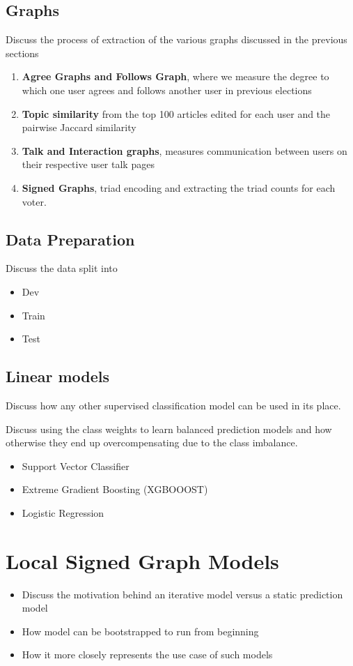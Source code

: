 \subsection{Graphs}
    Discuss the process of extraction of the various graphs discussed in the previous sections
    \begin{enumerate}
        \item \textbf{Agree Graphs and Follows Graph}, where we measure the degree to which one user agrees and follows another user in previous elections
        \item \textbf{Topic similarity} from the top 100 articles edited for each user and the pairwise Jaccard similarity 
        \item \textbf{Talk and Interaction graphs}, measures communication between users on their respective user talk pages
        \item \textbf{Signed Graphs}, triad encoding and extracting the triad counts for each voter. 
\end{enumerate}
\subsection{Data Preparation}
    Discuss the data split into
    \begin{itemize}
        \item Dev
        \item Train
        \item Test
    \end{itemize}
\subsection{Linear models}
    Discuss how any other supervised classification model can be used in its place.

    Discuss using the class weights to learn balanced prediction models and how otherwise they end up overcompensating due to the class imbalance.
        \begin{itemize}
        \item Support Vector Classifier
        \item Extreme Gradient Boosting (XGBOOOST) 
        \item Logistic Regression
    \end{itemize}

\section{Local Signed Graph Models}
\label{sec:local-signed-network-implementation}
    \begin{itemize}
        \item Discuss the motivation behind an iterative model versus a static prediction model
        \item How model can be bootstrapped to run from beginning
        \item How it more closely represents the use case of such models
    \end{itemize}
